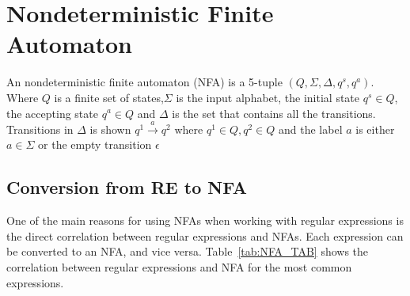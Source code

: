 \section{Nondeterministic Finite Automaton}
\begin{mydef}
An nondeterministic finite automaton (NFA) is a 5-tuple $(Q,\Sigma,\Delta,q^s ,q^a)$. Where $Q$ is a finite set of states,$\Sigma$ is the input alphabet, the initial state $q^s \in Q$,  the accepting state $q^a \in Q$ and $\Delta$ is the set that contains all the transitions. Transitions in $\Delta$ is shown $q^1\xrightarrow{a}q^2$ where $q^1\in Q,q^2\in Q$ and the label $a$ is either $a \in \Sigma$ or  the empty transition $\epsilon$
\end{mydef}

\subsection{Conversion from RE to NFA}
\label{RA_TO_NFA}
One of the main reasons for using NFAs when working with regular expressions is the direct correlation between regular expressions and NFAs. Each expression can be converted to an NFA, and vice versa. Table~\ref{tab:NFA_TAB} shows the correlation between regular expressions and NFA for the most common expressions.

